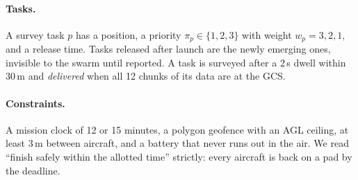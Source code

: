 \documentclass[10pt,a4paper,twocolumn]{article}
\begin{document}
\paragraph{Tasks.} A survey task $p$ has a position, a priority $\pi_p\in\{1,2,3\}$ with weight $w_p=3,2,1$, and a release time. Tasks released after launch are the newly emerging ones, invisible to the swarm until reported. A task is surveyed after a 2\,s dwell within 30\,m and \emph{delivered} when all 12 chunks of its data are at the GCS.

\paragraph{Constraints.} A mission clock of 12 or 15 minutes, a polygon geofence with an AGL ceiling, at least 3\,m between aircraft, and a battery that never runs out in the air. We read ``finish safely within the allotted time'' strictly: every aircraft is back on a pad by the deadline.
\end{document}

